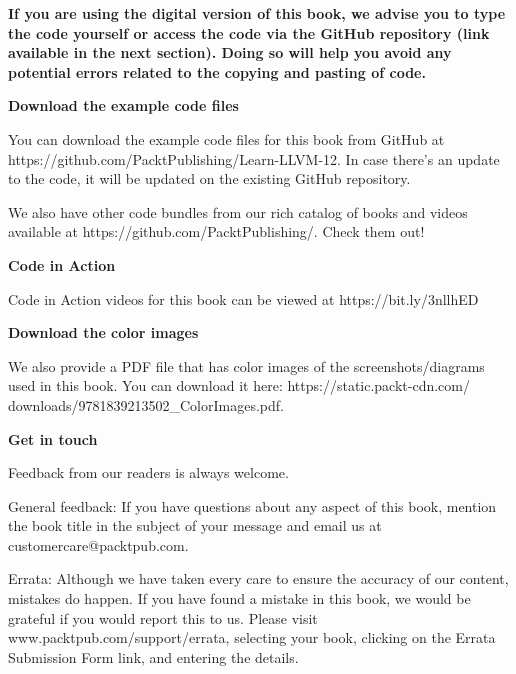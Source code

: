 \textbf{If you are using the digital version of this book, we advise you to type the code yourself or access the code via the GitHub repository (link available in the next section). Doing so will help you avoid any potential errors related to the copying and pasting of code.}\par

\hspace*{\fill} \par %
\textbf{Download the example code files}

You can download the example code files for this book from GitHub at https://github.com/PacktPublishing/Learn-LLVM-12. In case there's an update to the code, it will be updated on the existing GitHub repository.\par

We also have other code bundles from our rich catalog of books and videos available at https://github.com/PacktPublishing/. Check them out!\par

\hspace*{\fill} \par %
\textbf{Code in Action}

Code in Action videos for this book can be viewed at https://bit.ly/3nllhED \par

\hspace*{\fill} \par %
\textbf{Download the color images}

We also provide a PDF file that has color images of the screenshots/diagrams used in this book. You can download it here: 
https://static.packt-cdn.com/
downloads/9781839213502\_ColorImages.pdf.\par

\hspace*{\fill} \par %
\textbf{Get in touch}

Feedback from our readers is always welcome.\par

General feedback: If you have questions about any aspect of this book, mention the book title in the subject of your message and email us at customercare@packtpub.com.\par

Errata: Although we have taken every care to ensure the accuracy of our content, mistakes do happen. If you have found a mistake in this book, we would be grateful if you would report this to us. Please visit www.packtpub.com/support/errata, selecting your book, clicking on the Errata Submission Form link, and entering the details.\par

